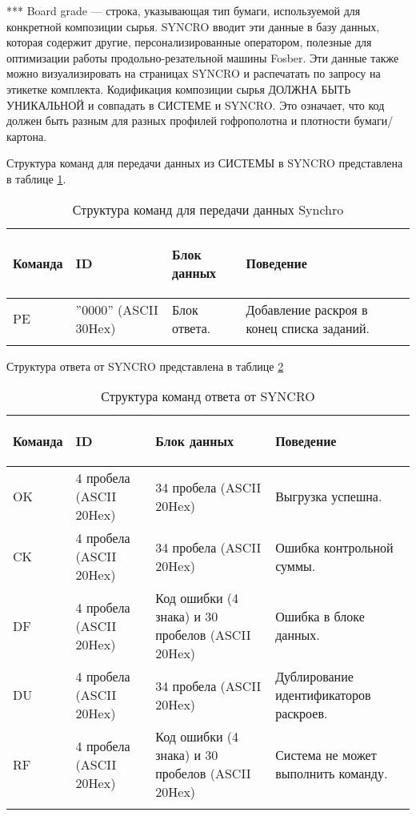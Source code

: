 *** Board grade --- строка, указывающая тип бумаги, используемой для конкретной композиции сырья. SYNCRO вводит эти данные в базу данных, которая содержит другие, персонализированные оператором, полезные для оптимизации работы продольно-резательной машины Fosber. 
Эти данные также можно визуализировать на страницах SYNCRO и распечатать по запросу на этикетке комплекта.
Кодификация композиции сырья ДОЛЖНА БЫТЬ УНИКАЛЬНОЙ и совпадать в СИСТЕМЕ и SYNCRO. Это означает, что код должен быть разным для разных профилей гофрополотна и плотности бумаги/картона.


Структура команд для передачи данных из СИСТЕМЫ в SYNCRO представлена в таблице \ref{tab:fosber_comand_send}.

\scriptsize
\begin{longtable}{|p{15mm}|p{35mm}|p{40mm}|p{70mm}|}
\hline
{\bf {\parbox[c][5mm]{15mm}{\raggedright Команда}}} & {\it {\bf \parbox[c]{35mm}{\raggedright ID}}} & {{\bf \parbox[c]{40mm}{\raggedright Блок данных}}} & {\bf \parbox[c]{70mm}{\raggedright Поведение}} \\
\hline
\parbox[c][5mm]{15mm}{PE} & \parbox{35mm}{''0000'' (ASCII 30Hex)} & \parbox{40mm}{Блок ответа.} & \parbox{70mm}{Добавление раскроя в конец списка заданий.} \\
\hline
\caption{Структура команд для передачи данных Synchro}\label{tab:fosber_comand_send}
\end{longtable}  
\normalsize

Структура ответа от SYNCRO представлена в таблице \ref{tab:fosber_answer_send}

\scriptsize
\begin{longtable}{|p{15mm}|p{35mm}|p{40mm}|p{70mm}|}
\hline
{\bf {\bf \parbox[c][5mm]{15mm}{\raggedright Команда}}} & {\it {\bf \parbox[c]{35mm}{\raggedright ID}}} & {\it {\bf \parbox[c]{40mm}{\raggedright Блок данных}}} & {\it {\bf \parbox[c]{70mm}{\raggedright Поведение}}} \\
\hline
\parbox[c][5mm]{15mm}{OK} & \parbox{35mm}{4 пробела (ASCII 20Hex)} & \parbox{40mm}{34 пробела (ASCII 20Hex)} & \parbox{70mm}{Выгрузка успешна.} \\
\hline
\parbox[c][5mm]{15mm}{CK} & \parbox{35mm}{4 пробела (ASCII 20Hex)} & \parbox{40mm}{34 пробела (ASCII 20Hex)} & \parbox{70mm}{Ошибка контрольной суммы.} \\
\hline
\parbox[c][5mm]{15mm}{DF} & \parbox{35mm}{4 пробела (ASCII 20Hex)} & \parbox{40mm}{Код ошибки (4 знака) и 30 пробелов (ASCII 20Hex)} & \parbox{70mm}{Ошибка в блоке данных.} \\
\hline
\parbox[c][5mm]{15mm}{DU} & \parbox{35mm}{4 пробела (ASCII 20Hex)} & \parbox{40mm}{34 пробела (ASCII 20Hex)} & \parbox{70mm}{Дублирование идентификаторов раскроев.} \\
\hline
\parbox[c][5mm]{15mm}{RF} & \parbox{35mm}{4 пробела (ASCII 20Hex)} & \parbox{40mm}{Код ошибки (4 знака) и 30 пробелов (ASCII 20Hex)} & \parbox{70mm}{Система не может выполнить команду.} \\
\hline
\caption{Структура команд ответа от SYNCRO}\label{tab:fosber_answer_send}
\end{longtable}  
\normalsize

